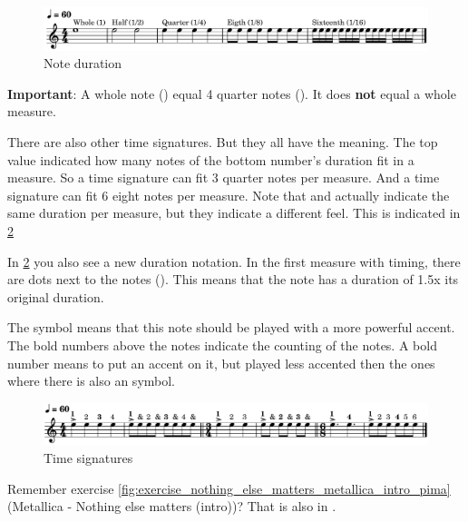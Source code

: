 \begin{figure}[h]
	\centering
	\includegraphics[width=\textwidth]{../../MuseScore/Guitar/MusicNotation/NoteDurations_Basic.png}
	\caption{Note duration}
	\label{fig:note_duration_basic}
\end{figure}

\textbf{Important}: A whole note (\wholeNote) equal 4 quarter notes (\quarterNote). It does \textbf{not} equal a whole measure. \newline

There are also other time signatures. But they all have the meaning. The top value indicated how many notes of the bottom number's duration fit in a measure. So a  time signature can fit 3 quarter notes per measure. And a  time signature can fit 6 eight notes per measure. Note that  and  actually indicate the same duration per measure, but they indicate a different feel. This is indicated in \ref{fig:time_signatures}

In \ref{fig:time_signatures} you also see a new duration notation. In the first measure with  timing, there are dots next to the notes (\quarterNoteDottedDown). This means that the note has a duration of 1.5x its original duration.

The \lilyAccent symbol means that this note should be played with a more powerful accent. The bold numbers above the notes indicate the counting of the notes. A bold number means to put an accent on it, but played less accented then the ones where there is also an \lilyAccent symbol.

\begin{figure}[h]
	\centering
	\includegraphics[width=\textwidth]{../../MuseScore/Guitar/MusicNotation/TimeSignature.png}
	\caption{Time signatures}
	\label{fig:time_signatures}
\end{figure}

Remember exercise \ref{fig:exercise_nothing_else_matters_metallica_intro_pima} (Metallica - Nothing else matters (intro))? That is also in .


